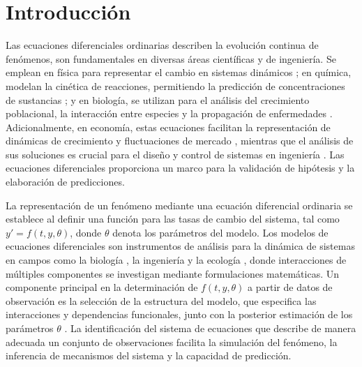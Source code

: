 \chapter*{Introducción}\label{chapter:introduction}

Las ecuaciones diferenciales ordinarias describen la evolución continua de fen\'omenos, son fundamentales en diversas 
áreas científicas y de ingeniería. Se emplean en física para representar el cambio en sistemas dinámicos \cite{strogatz2015}; en química, modelan 
la cinética de reacciones, permitiendo la predicción de concentraciones de sustancias \cite{atkins2014}; y en biología, se utilizan para el análisis 
del crecimiento poblacional, la interacción entre especies y la propagación de enfermedades \cite{murray2002}. Adicionalmente, en economía, estas 
ecuaciones facilitan la representación 
de dinámicas de crecimiento y fluctuaciones de mercado \cite{chiang2005}, mientras que el análisis de sus soluciones es crucial para el diseño y control 
de sistemas en ingeniería \cite{ogata2010}. Las ecuaciones diferenciales proporciona un marco para la validación de hipótesis y la 
elaboración de predicciones.

La representación de un fenómeno mediante una ecuación diferencial ordinaria se establece al definir una función para las tasas de cambio del sistema, 
tal como $y' = f(t, y, \theta)$, donde $\theta$ denota los parámetros del modelo. Los modelos de ecuaciones diferenciales son instrumentos de análisis para 
la dinámica de sistemas en campos como la biología \cite{alon2006}, la ingeniería \cite{ljung1999} y la ecología \cite{turchin2003}, donde interacciones de 
múltiples componentes se investigan mediante formulaciones matemáticas. Un componente principal en la determinación de $f(t, y, \theta)$ a partir de datos de 
observación es la selección de la estructura del modelo, que especifica las interacciones y dependencias funcionales, junto con la posterior estimación de los 
parámetros $\theta$ \cite{brunton2022}. La identificación del sistema de ecuaciones que describe de manera adecuada un conjunto de observaciones facilita la 
simulación del fenómeno, 
la inferencia de mecanismos del sistema y la capacidad de predicción.

